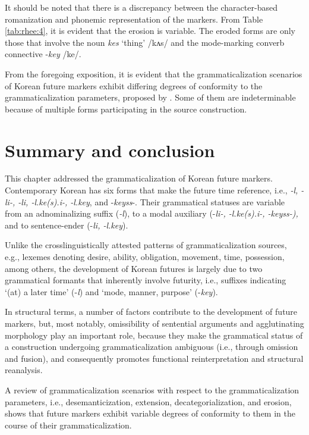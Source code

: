 \documentclass[output=paper,colorlinks,citecolor=brown]{langscibook}
\begin{document}
It should be noted that there is a discrepancy between the character-based romanization and phonemic representation of the markers. From Table \ref{tab:rhee:4}, it is evident that the erosion is variable. The eroded forms are only those that involve the noun \textit{kes} ‘thing’ /kʌs/ and the mode-marking converb connective -\textit{key} /ke/. 

From the foregoing exposition, it is evident that the grammaticalization scenarios of Korean future markers exhibit differing degrees of conformity to the grammaticalization parameters, proposed by \citet{Kuteva2019}. Some of them are indeterminable because of multiple forms participating in the source construction.


\section{Summary and conclusion} \label{sec:4}

This chapter addressed the grammaticalization of Korean future markers. Contemporary Korean has six forms that make the future time reference, i.e., \textit{-l, -li-, -li, -l.ke(s).i-, -l.key}, and -\textit{keyss}-. Their grammatical statuses are variable from an adnominalizing suffix (\textit{-l}), to a modal auxiliary (-\textit{li-, -l.ke(s).i-, -keyss-),} and to sentence-ender (-\textit{li, -l.key}). 

Unlike the crosslinguistically attested patterns of grammaticalization sources, e.g., lexemes denoting desire, ability, obligation, movement, time, possession, among others, the development of Korean futures is largely due to two grammatical formants that inherently involve futurity, i.e., suffixes indicating ‘(at) a later time’ (-\textit{l}) and ‘mode, manner, purpose’ (-\textit{key}). 

In structural terms, a number of factors contribute to the development of future markers, but, most notably, omissibility of sentential arguments and agglutinating morphology play an important role, because they make the grammatical status of a construction undergoing grammaticalization ambiguous (i.e., through omission and fusion), and consequently promotes functional reinterpretation and structural reanalysis. 

A review of grammaticalization scenarios with respect to the grammaticalization parameters, i.e., desemanticization, extension, decategorialization, and erosion, shows that future markers exhibit variable degrees of conformity to them in the course of their grammaticalization.
\end{document}
